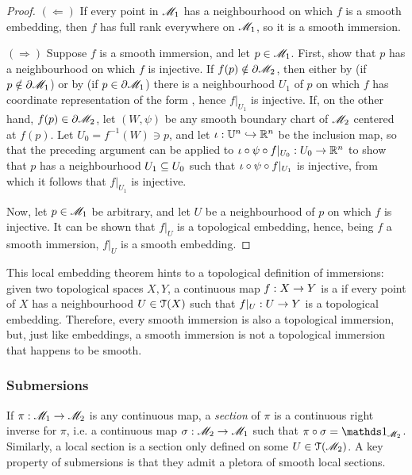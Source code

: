 \begin{proofbox}
  \begin{proof}
    $ (\Leftarrow) $ If every point in $ \mathscr{M}_1 $ has a neighbourhood on which $ f $ is a smooth embedding, then $ f $ has full rank everywhere on $ \mathscr{M}_1 $, so it is a smooth immersion.

    $ (\Rightarrow) $ Suppose $ f $ is a smooth immersion, and let $ p \in \mathscr{M}_1 $. First, show that $ p $ has a neighbourhood on which $ f $ is injective. If $ f(p) \notin \partial \mathscr{M}_2 $, then either by  (if $ p \notin \partial \mathscr{M}_1 $) or by  (if $ p \in \partial \mathscr{M}_1 $) there is a neighbourhood $ U_1 $ of $ p $ on which $ f $ has coordinate representation of the form , hence $ f \vert_{U_1} $ is injective. If, on the other hand, $ f(p) \in \partial \mathscr{M}_2 $, let $ (W,\psi) $ be any smooth boundary chart of $ \mathscr{M}_2 $ centered at $ f(p) $. Let $ U_0 = f^{-1}(W) \ni p $, and let $ \iota : \mathbb{U}^n \hookrightarrow \mathbb{R}^n $ be the inclusion map, so that the preceding argument can be applied to $ \iota \circ \psi \circ f \vert_{U_0} : U_0 \rightarrow \mathbb{R}^n $ to show that $ p $ has a neighbourhood $ U_1 \subseteq U_0 $ such that $ \iota \circ \psi \circ f \vert_{U_1} $ is injective, from which it follows that $ f \vert_{U_1} $ is injective.

    Now, let $ p \in \mathscr{M}_1 $ be arbitrary, and let $ U $ be a neighbourhood of $ p $ on which $ f $ is injective. It can be shown that $ f \vert_U $ is a topological embedding, hence, being $ f $ a smooth immersion, $ f \vert_U $ is a smooth embedding.
  \end{proof}
\end{proofbox}

This local embedding theorem hints to a topological definition of immersions: given two topological spaces $ X,Y $, a continuous map $ f : X \rightarrow Y $ is a  if every point of $ X $ has a neighbourhood $ U \in \EuScript{T}(X) $ such that $ f \vert_U : U \rightarrow Y $ is a topological embedding. Therefore, every smooth immersion is also a topological immersion, but, just like embeddings, a smooth immersion is not a topological immersion that happens to be smooth.

\subsubsection{Submersions}

If $ \pi : \mathscr{M}_1 \rightarrow \mathscr{M}_2 $ is any continuous map, a \emph{section} of $ \pi $ is a continuous right inverse for $ \pi $, i.e. a continuous map $ \sigma : \mathscr{M}_2 \rightarrow \mathscr{M}_1 $ such that $ \pi \circ \sigma = \id_{\man_2} $. Similarly, a local section is a section only defined on some $ U \in \EuScript{T}(\mathscr{M}_2) $. A key property of submersions is that they admit a pletora of smooth local sections.

